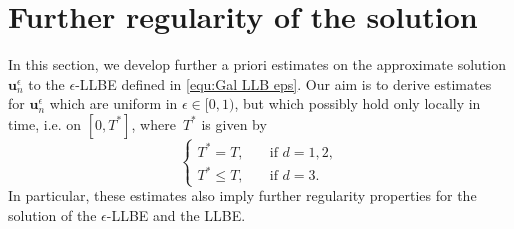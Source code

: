 \documentclass[11pt,reqno]{amsart}
\theoremstyle{definition}
\numberwithin{equation}{section}
\newcommand{\bff}{\boldsymbol}
\begin{document}
\section{Further regularity of the solution}\label{sec:further regular proof}

In this section, we develop further a priori estimates on the approximate solution $\bff{u}_n^\epsilon$ to the $\epsilon$-LLBE defined in \eqref{equ:Gal LLB eps}. Our aim is to derive estimates for $\bff{u}_n^\epsilon$ which are uniform in $\epsilon\in [0,1)$, but which possibly hold only locally in time, i.e. on $[0,T^\ast]$, where~$T^\ast$ is given by
    \begin{equation}\label{equ:T ast llbe}
		\begin{cases}
			T^\ast = T, \quad & \text{if } d=1,2,
			\\
			T^\ast \le T, \quad & \text{if } d=3.
		\end{cases}
	\end{equation}
In particular, these estimates also imply further regularity properties for the solution of the $\epsilon$-LLBE and the LLBE.
\end{document}
